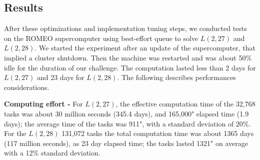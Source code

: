 %

\subsection{Results}
After these optimizations and implementation tuning steps, we conducted tests on the ROMEO supercomputer using best-effort queue to solve $L(2,27)$ and $L(2,28)$. 
We started the experiment after an update of the supercomputer, that implied a cluster shutdown. 
Then the machine was restarted and was about 50\% idle for the duration of our challenge. 
The computation lasted less than 2 days for $L(2,27)$ and 23 days for $L(2,28)$. 
The following describes performances considerations.

\textbf{Computing effort -} 
For $L(2,27)$, the effective computation time of the 32,768 tasks was about 30 million seconds (345.4 days), and 165,000" elapsed time (1.9 days); the average time of the tasks was 911", with a standard deviation of 20\%.
For the $L(2,28)$ 131,072 tasks the total computation time was about 1365 days (117 million seconds), as 23 day elapsed time; the tasks lasted 1321" on average with a 12\% standard deviation.

